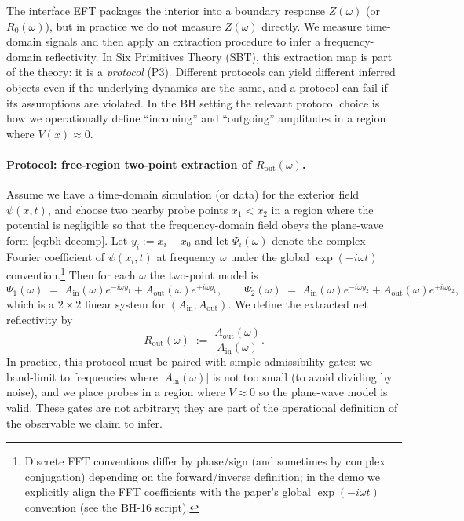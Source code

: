 
The interface EFT packages the interior into a boundary response $Z(\omega)$ (or $R_0(\omega)$), but in practice we do not measure $Z(\omega)$ directly. We measure time-domain signals and then apply an extraction procedure to infer a frequency-domain reflectivity. In Six Primitives Theory (SBT), this extraction map is part of the theory: it is a \emph{protocol} (P3). Different protocols can yield different inferred objects even if the underlying dynamics are the same, and a protocol can fail if its assumptions are violated. In the BH setting the relevant protocol choice is how we operationally define ``incoming'' and ``outgoing'' amplitudes in a region where $V(x)\approx 0$.

\paragraph{Protocol: free-region two-point extraction of $R_{\mathrm{out}}(\omega)$.}
Assume we have a time-domain simulation (or data) for the exterior field $\psi(x,t)$, and choose two nearby probe points $x_1<x_2$ in a region where the potential is negligible so that the frequency-domain field obeys the plane-wave form \eqref{eq:bh-decomp}. Let $y_i:=x_i-x_0$ and let $\Psi_i(\omega)$ denote the complex Fourier coefficient of $\psi(x_i,t)$ at frequency $\omega$ under the global $\exp(-i\omega t)$ convention.\footnote{Discrete FFT conventions differ by phase/sign (and sometimes by complex conjugation) depending on the forward/inverse definition; in the demo we explicitly align the FFT coefficients with the paper’s global $\exp(-i\omega t)$ convention (see the BH-16 script).}
Then for each $\omega$ the two-point model is
\begin{equation}
  \Psi_1(\omega) \;=\; A_{\mathrm{in}}(\omega)e^{-i\omega y_1} + A_{\mathrm{out}}(\omega)e^{+i\omega y_1},
  \qquad
  \Psi_2(\omega) \;=\; A_{\mathrm{in}}(\omega)e^{-i\omega y_2} + A_{\mathrm{out}}(\omega)e^{+i\omega y_2},
  \label{eq:bh-two-point}
\end{equation}
which is a $2\times 2$ linear system for $(A_{\mathrm{in}},A_{\mathrm{out}})$. We define the extracted net reflectivity by
\begin{equation}
  R_{\mathrm{out}}(\omega) \;:=\; \frac{A_{\mathrm{out}}(\omega)}{A_{\mathrm{in}}(\omega)}.
  \label{eq:bh-Rout-extract}
\end{equation}
In practice, this protocol must be paired with simple admissibility gates: we band-limit to frequencies where $|A_{\mathrm{in}}(\omega)|$ is not too small (to avoid dividing by noise), and we place probes in a region where $V\approx 0$ so the plane-wave model is valid. These gates are not arbitrary; they are part of the operational definition of the observable we claim to infer.

